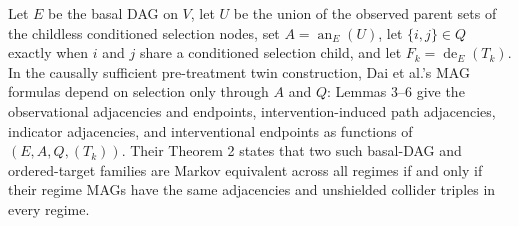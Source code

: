 Let \(E\) be the basal DAG on \(V\), let \(U\) be the union of the observed parent sets of the childless conditioned selection nodes, set \(A=\operatorname{an}_E(U)\), let \(\{i,j\}\in Q\) exactly when \(i\) and \(j\) share a conditioned selection child, and let \(F_k=\operatorname{de}_E(T_k)\).  In the causally sufficient pre-treatment twin construction, Dai et al.'s MAG formulas depend on selection only through \(A\) and \(Q\): Lemmas 3--6 give the observational adjacencies and endpoints, intervention-induced path adjacencies, indicator adjacencies, and interventional endpoints as functions of \((E,A,Q,(T_k))\).  Their Theorem 2 states that two such basal-DAG and ordered-target families are Markov equivalent across all regimes if and only if their regime MAGs have the same adjacencies and unshielded collider triples in every regime.